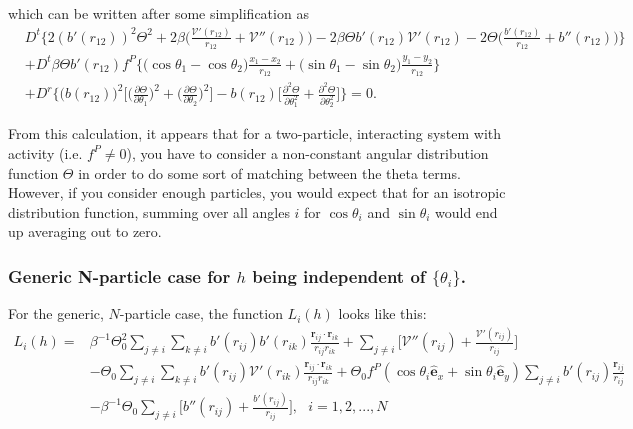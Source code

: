 \documentclass{article}
\begin{document}
which can be written after some simplification as
\begin{align}
  &D^t\bigg\{2(b'(r_{12}))^2\Theta^2
    +2\beta\bigg(\frac{\mathcal{V}'(r_{12})}{r_{12}}
    +\mathcal{V}''(r_{12})\bigg)
    -2\beta \Theta b'(r_{12})\mathcal{V}'(r_{12})
    -2\Theta\bigg(\frac{b'(r_{12})}{r_{12}}
    +b''(r_{12})\bigg)\bigg\}\nonumber\\
  &+D^t\beta \Theta b'(r_{12})f^P
    \bigg\{\big(\cos\theta_1-\cos\theta_2)\frac{x_1-x_2}{r_{12}}
    +\big(\sin\theta_1-\sin\theta_2)\frac{y_1-y_2}{r_{12}}\bigg\}\nonumber\\
  &+D^r\bigg\{\big(b(r_{12})\big)^2\bigg[\bigg(\frac{\partial \Theta}
    {\partial \theta_1}\bigg)^2
    +\bigg(\frac{\partial \Theta}{\partial \theta_2}\bigg)^2\bigg]
    -b(r_{12})\bigg[\frac{\partial^2 \Theta}{\partial \theta_1^2}
    +\frac{\partial^2 \Theta}{\partial \theta_2^2}\bigg]\bigg\}=0.
\end{align}

From this calculation, it appears that for a two-particle, interacting system with activity
(i.e. $f^P\neq0$), you have to consider a non-constant angular distribution function
$\Theta$ in order to do some sort of matching between the theta terms. However, if you consider
enough particles, you would expect that for an isotropic distribution function, summing over all
angles $i$ for $\cos\theta_i$ and $\sin\theta_i$ would end up averaging out to zero.

\subsubsection{Generic N-particle case for $h$ being independent of $\{\theta_i\}$.}
For the generic, $N$-particle case, the function $L_i(h)$ looks like this:
\begin{align}\label{eq:genericNpart}
  L_i(h) =& \beta^{-1}\Theta_0^2\sum_{j\neq i}\sum_{k\neq i} b'(r_{ij})b'(r_{ik})
            \frac{\bm{r}_{ij}\cdot\bm{r}_{ik}}{r_{ij}r_{ik}}
            + \sum_{j\neq i}\bigg[\mathcal{V}''(r_{ij})
            +\frac{\mathcal{V}'(r_{ij})}{r_{ij}}\bigg]\nonumber\\
          & - \Theta_0\sum_{j\neq i}\sum_{k\neq i}b'(r_{ij})\mathcal{V}'(r_{ik})
            \frac{\bm{r}_{ij}\cdot\bm{r}_{ik}}{r_{ij}r_{ik}}
            +\Theta_0f^P(\cos\theta_i\hat{\bm{e}}_x+\sin\theta_i\hat{\bm{e}}_y)
            \sum_{j\neq i}b'(r_{ij})
            \frac{\bm{r}_{ij}}{r_{ij}}\nonumber\\
          & - \beta^{-1}\Theta_0\sum_{j\neq i}\bigg[b''(r_{ij})
            +\frac{b'(r_{ij})}{r_{ij}}\bigg],\:\:\: i = 1,2,...,N
\end{align}
\end{document}
